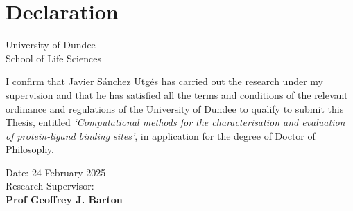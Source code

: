 \chapter*{Declaration} %

\begin{center}
    \LARGE University of Dundee\\[1cm]
    \LARGE School of Life Sciences\\[2cm]
\end{center}

I confirm that Javier Sánchez Utgés has carried out the research under my supervision and that he has satisfied all the terms and conditions of the relevant ordinance and regulations of the University of Dundee to qualify to submit this Thesis, entitled \textit{`Computational methods for the characterisation and evaluation of protein-ligand binding sites'}, in application for the degree of Doctor of Philosophy.

\vfill

\begin{flushright}
    Date: 24 February 2025\\[1.5cm]
    Research Supervisor: \underline{\hspace{6cm}}\\[1cm]
    \textbf{Prof Geoffrey J. Barton}
\end{flushright}